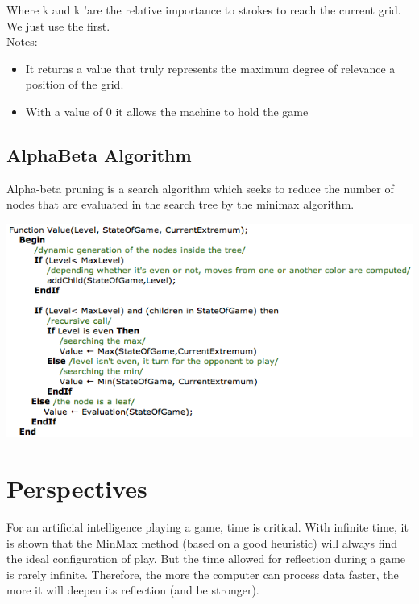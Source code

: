 \documentclass{report}
\begin{document}
Where k and k 'are the relative importance to strokes to reach the current
grid. We just use the first.\\
Notes:
\begin{itemize}
    \item It returns a value that truly represents the maximum degree of relevance
        a position of the grid.
    \item With a value of 0 it allows the machine to hold the game 
\end{itemize}


\section{AlphaBeta Algorithm  }


Alpha-beta pruning is a search algorithm which seeks to reduce the number of nodes that are evaluated in the search tree by the minimax algorithm.

\begin{center}
\includegraphics[scale=0.60]{images/AlphaBeta.png}
\end{center}


\chapter {Perspectives}


For an artificial intelligence playing a game, time is critical. With infinite time, it is shown that the MinMax method (based on a good heuristic) will always find the ideal configuration of play. But the time allowed for reflection during a game is rarely infinite. Therefore, the more the computer can process data faster, the more it will deepen its reflection (and be stronger). \\
\end{document}
